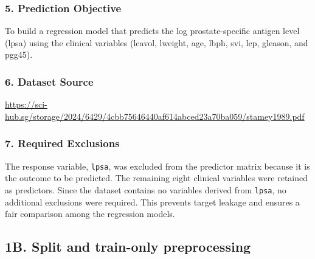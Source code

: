 \documentclass[
  11pt,
]{article}
\begin{document}
\subsubsection{5. Prediction Objective}\label{prediction-objective}

To build a regression model that predicts the log prostate-specific
antigen level (lpsa) using the clinical variables (lcavol, lweight, age,
lbph, svi, lcp, gleason, and pgg45).

\subsubsection{6. Dataset Source}\label{dataset-source}

\url{https://sci-hub.sg/storage/2024/6429/4cbb75646440af614abced23a70ba059/stamey1989.pdf}

\subsubsection{7. Required Exclusions}\label{required-exclusions}

The response variable, \texttt{lpsa}, was excluded from the predictor
matrix because it is the outcome to be predicted. The remaining eight
clinical variables were retained as predictors. Since the dataset
contains no variables derived from \texttt{lpsa}, no additional
exclusions were required. This prevents target leakage and ensures a
fair comparison among the regression models.

\subsection{1B. Split and train-only
preprocessing}\label{b.-split-and-train-only-preprocessing}
\end{document}

